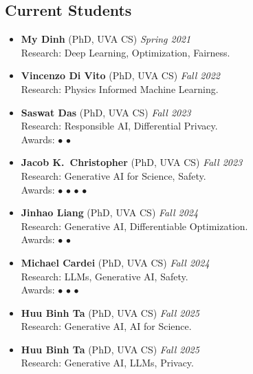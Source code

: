 \medskip

\subsection*{Current Students}
\begin{itemize}

  \item \textbf{My Dinh} (PhD, {\sc UVA} CS) 
  \hfill{\em Spring 2021}\\
  {\sc Research}: Deep Learning, Optimization, Fairness.

  \item \textbf{Vincenzo Di Vito} (PhD, {\sc UVA} CS)
  \hfill{\em Fall 2022}\\
  {\sc Research:} Physics Informed Machine Learning.
  
  \item \textbf{Saswat Das} (PhD, {\sc UVA} CS)
  \hfill{\em Fall 2023}\\
  {\sc Research:} Responsible AI, Differential Privacy.\\
  {\sc Awards:} 
  $\bullet$ 
  $\bullet$ 

  \item \textbf{Jacob K.~Christopher} (PhD, {\sc UVA} CS)
  \hfill{\em Fall 2023}\\
  {\sc Research:} Generative AI for Science, Safety.\\
  {\sc Awards:} 
  $\bullet$ 
  $\bullet$  
  $\bullet$ 
  $\bullet$ 

  \item \textbf{Jinhao Liang} (PhD, {\sc UVA} CS)
  \hfill{\em Fall 2024}\\
  {\sc Research:} Generative AI, Differentiable Optimization.\\
  {\sc Awards:} 
  $\bullet$ 
  $\bullet$ 
  
  \item \textbf{Michael Cardei} (PhD, {\sc UVA} CS)
  \hfill{\em Fall 2024}\\
  {\sc Research:} LLMs, Generative AI, Safety.\\
  {\sc Awards:} 
  $\bullet$ 
  $\bullet$ 
  $\bullet$ 

  \item \textbf{Huu Binh Ta} (PhD, {\sc UVA} CS)
  \hfill{\em Fall 2025}\\
  {\sc Research:} Generative AI, AI for Science.
  
  \item \textbf{Huu Binh Ta} (PhD, {\sc UVA} CS)
  \hfill{\em Fall 2025}\\
  {\sc Research:} Generative AI, LLMs, Privacy.

\end{itemize}


